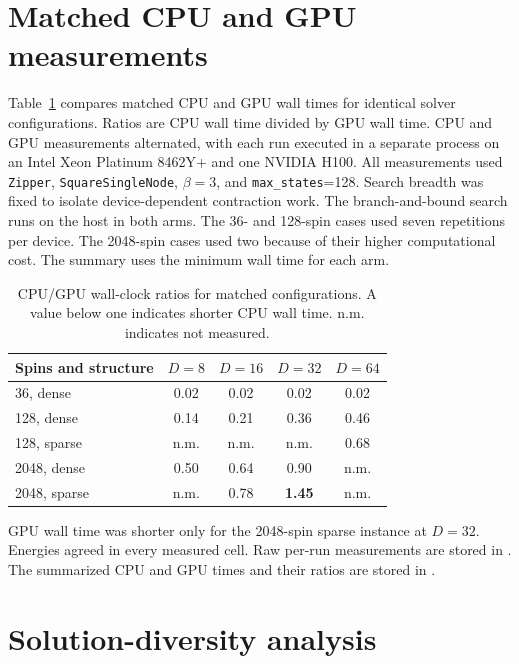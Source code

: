 
\section{Matched CPU and GPU measurements}
\label{sec:supp-crossover}

Table~\ref{tab:supp-crossover} compares matched CPU and GPU wall times for
identical solver configurations. Ratios are CPU wall time divided by GPU wall
time. CPU and GPU measurements alternated, with each run executed in a separate
process on an Intel Xeon Platinum 8462Y+ and one NVIDIA H100. All measurements
used \texttt{Zipper}, \texttt{SquareSingleNode}, $\beta=3$, and
\texttt{max\_states}=128. Search breadth was fixed to isolate device-dependent
contraction work. The branch-and-bound search runs on the host in both arms. The
36- and 128-spin cases used seven repetitions per device. The 2048-spin cases
used two because of their higher computational cost. The summary uses the
minimum wall time for each arm.

\begin{table}[htbp]
\small
\centering
\caption{CPU/GPU wall-clock ratios for matched configurations. A value below
one indicates shorter CPU wall time. n.m. indicates not measured.}
\label{tab:supp-crossover}
\begin{tabular}{@{}lcccc@{}}
\toprule
Spins and structure & $D{=}8$ & $D{=}16$ & $D{=}32$ & $D{=}64$ \\
\midrule
36, dense     & 0.02 & 0.02 & 0.02 & 0.02 \\
128, dense    & 0.14 & 0.21 & 0.36 & 0.46 \\
128, sparse   & n.m. & n.m. & n.m. & 0.68 \\
2048, dense   & 0.50 & 0.64 & 0.90 & n.m. \\
2048, sparse  & n.m. & 0.78 & \textbf{1.45} & n.m. \\
\bottomrule
\end{tabular}
\end{table}

GPU wall time was shorter only for the 2048-spin sparse instance at $D=32$.
Energies agreed in every measured cell. Raw per-run measurements are stored in
. The summarized CPU and GPU times and their ratios
are stored in .
\FloatBarrier

\section{Solution-diversity analysis}
\label{sec:supp-diversity}

